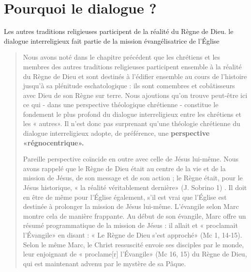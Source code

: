 \chapter{Pourquoi le dialogue ? }



\begin{Synthesis}
Les autres traditions religieuses participent de la réalité du Règne de Dieu.
le dialogue interreligieux
fait partie de la mission évangélisatrice de l’Église

\end{Synthesis}

\begin{quote}

Nous avons noté dans le chapitre précédent que les chrétiens
et les membres des autres traditions religieuses participent
ensemble à la réalité du Règne de Dieu et sont destinés à
l'édifier ensemble au cours de l'histoire jusqu'à sa plénitude
eschatologique : ils sont comembres et cobâtisseurs avec Dieu
de son Règne sur terre. Nous ajoutions qu'on trouve peut-être
ici ce qui - dans une perspective théologique chrétienne -
constitue le fondement le plus profond du dialogue interreligieux
entre les chrétiens et les « autres». Il n'est donc pas surprenant
qu'une théologie chrétienne du dialogue interreligieux
adopte, de préférence, une \textbf{perspective «régnocentrique».}


Pareille perspective coïncide en outre avec celle de Jésus
lui-même. Nous avons rappelé que le Règne de Dieu était au
centre de la vie et de la mission de Jésus, de son message et
de son action ; le Règne était, pour le Jésus historique, « la réalité
véritablement dernière» (J. Sobrino 1) . Il doit en être de
même pour l'Église également, s'il est vrai que l'Église est
destinée à prolonger la mission de Jésus lui-même. L'évangile
selon Marc montre cela de manière frappante. Au début de son
évangile, Marc offre un résumé programmatique de la mission
de Jésus : il allait et « proclamait l'Évangile» en disant : « Le
Règne de Dieu s'est approché» (Mc 1, 14-15). Selon le même
Marc, le Christ ressuscité envoie ses disciples par le monde,
leur enjoignant de « proclame[r] l'Évangile» (Mc 16, 15) du Règne de Dieu, qui est maintenant advenu par le mystère de
sa Pâque.


\end{quote}
